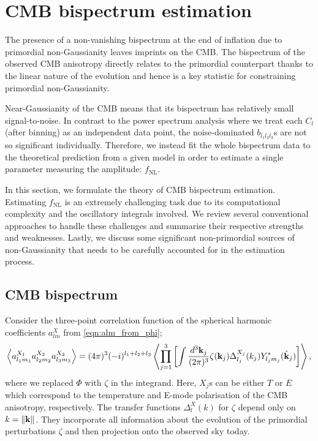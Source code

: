 \section{CMB bispectrum estimation} \label{section:CMB_bispectrum_estimation}

The presence of a non-vanishing bispectrum at the end of inflation due to primordial non-Gaussianity leaves imprints on the CMB. The bispectrum of the observed CMB anisotropy directly relates to the primordial counterpart thanks to the linear nature of the evolution and hence is a key statistic for constraining primordial non-Gaussianity.

Near-Gaussianity of the CMB means that its bispectrum has relatively small signal-to-noise. In contrast to the power spectrum analysis where we treat each $C_l$ (after binning) as an independent data point, the noise-dominated $b_{l_1 l_2 l_3}$s are not so significant individually. Therefore, we instead fit the whole bispectrum data to the theoretical prediction from a given model in order to estimate a single parameter measuring the amplitude: $f_\text{NL}$.

In this section, we formulate the theory of CMB bispectrum estimation. Estimating $f_\text{NL}$ is an extremely challenging task due to its computational complexity and the oscillatory integrals involved. We review several conventional approaches to handle these challenges and summarise their respective strengths and weaknesses. Lastly, we discuss some significant non-primordial sources of non-Gaussianity that needs to be carefully accounted for in the estimation process.


\subsection{CMB bispectrum}

Consider the three-point correlation function of the spherical harmonic coefficients $a_{lm}^X$ from \eqref{eqn:alm_from_phi};
\begin{align}
	\left< a_{l_1 m_1}^{X_1} a_{l_2 m_2}^{X_2} a_{l_3 m_3}^{X_3}  \right> = (4\pi)^3 (-i)^{l_1 + l_2 + l_3} \left< \prod_{j=1}^{3} \left[ \int \frac{d^3\mathbf{k}_j}{(2\pi)^3} \zeta(\mathbf{k}_j)   \Delta_{l_j}^{X_j} (k_j) Y^*_{l_j m_j} (\hat{\mathbf{k}}_j) \right] \right>, \label{eqn:bispectrum_derivation_base_form}
\end{align}
where we replaced $\Phi$ with $\zeta$ in the integrand. Here, $X_j$s can be either $T$ or $E$ which correspond to the temperature and E-mode polarisation of the CMB anisotropy, respectively. The transfer functions $\Delta_l^X (k)$ for $\zeta$ depend only on $k=\left\| \mathbf{k} \right\|$. They incorporate all information about the evolution of the primordial perturbations $\zeta$ and then projection onto the observed sky today.

